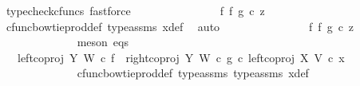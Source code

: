 \begin{isabellebody}
\ {\isacharparenleft}{\kern0pt}typecheck{\isacharunderscore}{\kern0pt}cfuncs{\isacharcomma}{\kern0pt}\ fastforce{\isacharparenright}{\kern0pt}\isanewline
\ \ \ \ \ \ \ \ \ \ \isamarkupfalse%
\ \isamarkupfalse%
\ {\isachardoublequoteopen}{\isachardot}{\kern0pt}{\isachardot}{\kern0pt}{\isachardot}{\kern0pt}\ {\isacharequal}{\kern0pt}\ {\isacharparenleft}{\kern0pt}f\ {\isasymbowtie}\isactrlsub f\ g{\isacharparenright}{\kern0pt}\ {\isasymcirc}\isactrlsub c\ z{}{\isachardoublequoteclose}\isanewline
\ \ \ \ \ \ \ \ \ \ \ \ \isamarkupfalse%
\ cfunc{\isacharunderscore}{\kern0pt}bowtie{\isacharunderscore}{\kern0pt}prod{\isacharunderscore}{\kern0pt}def{}\ type{\isacharunderscore}{\kern0pt}assms\ x{}{\isacharunderscore}{\kern0pt}def\ \isamarkupfalse%
\ auto\isanewline
\ \ \ \ \ \ \ \ \ \ \isamarkupfalse%
\ \isamarkupfalse%
\ {\isachardoublequoteopen}{\isachardot}{\kern0pt}{\isachardot}{\kern0pt}{\isachardot}{\kern0pt}\ {\isacharequal}{\kern0pt}\ {\isacharparenleft}{\kern0pt}f\ {\isasymbowtie}\isactrlsub f\ g{\isacharparenright}{\kern0pt}\ {\isasymcirc}\isactrlsub c\ z{}{\isachardoublequoteclose}\isanewline
\ \ \ \ \ \ \ \ \ \ \ \ \isamarkupfalse%
\ {\isacharparenleft}{\kern0pt}meson\ eqs{\isacharparenright}{\kern0pt}\isanewline
\ \ \ \ \ \ \ \ \ \ \isamarkupfalse%
\ \isamarkupfalse%
\ {\isachardoublequoteopen}{\isachardot}{\kern0pt}{\isachardot}{\kern0pt}{\isachardot}{\kern0pt}\ {\isacharequal}{\kern0pt}\ {\isacharparenleft}{\kern0pt}{\isacharparenleft}{\kern0pt}left{\isacharunderscore}{\kern0pt}coproj\ Y\ W\ {\isasymcirc}\isactrlsub c\ f{\isacharparenright}{\kern0pt}\ {\isasymamalg}\ {\isacharparenleft}{\kern0pt}right{\isacharunderscore}{\kern0pt}coproj\ Y\ W\ {\isasymcirc}\isactrlsub c\ g{\isacharparenright}{\kern0pt}{\isacharparenright}{\kern0pt}\ {\isasymcirc}\isactrlsub c\ left{\isacharunderscore}{\kern0pt}coproj\ X\ V\ {\isasymcirc}\isactrlsub c\ x{}{\isachardoublequoteclose}\isanewline
\ \ \ \ \ \ \ \ \ \ \ \ \isamarkupfalse%
\ cfunc{\isacharunderscore}{\kern0pt}bowtie{\isacharunderscore}{\kern0pt}prod{\isacharunderscore}{\kern0pt}def{}\ type{\isacharunderscore}{\kern0pt}assms{\isacharparenleft}{\kern0pt}{}{\isacharparenright}{\kern0pt}\ type{\isacharunderscore}{\kern0pt}assms{\isacharparenleft}{\kern0pt}{}{\isacharparenright}{\kern0pt}\ x{}{\isacharunderscore}{\kern0pt}def\ \isamarkupfalse%

\end{isabellebody}
